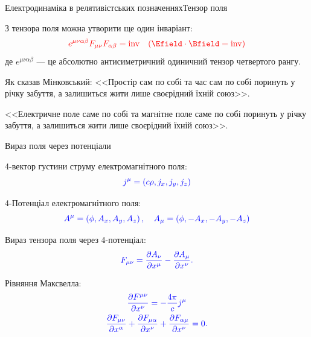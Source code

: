 \documentclass[9pt]{beamer}
\begin{document}
\begin{frame}{Електродинаміка в релятивістських позначеннях}{Тензор поля}
\begin{overprint}
	З тензора поля можна утворити ще один інваріант:
	\begin{equation*}\color{red}
		e^{\mu\nu\alpha\beta}F_{\mu\nu}F_{\alpha\beta} = \mathrm{inv}  \quad (\Efield\cdot\Bfield = \mathrm{inv})
	\end{equation*}
	де $  e^{\mu\nu\alpha\beta}$ --- це абсолютно антисиметричний одиничний тензор четвертого рангу.
	\onslide<2>
	\begin{block}{}
		Як сказав Мінковський: <<Простір сам по собі та час сам по собі поринуть у річку забуття, а залишиться жити лише своєрідний їхній союз>>.
	\end{block}
	\begin{block}{}
		<<Електричне поле саме по собі та магнітне поле саме по собі поринуть у річку забуття, а залишиться жити лише своєрідний їхній союз>>.
	\end{block}

\end{overprint}


\end{frame}





\begin{frame}{Вираз поля через потенціали}{}

	4-вектор густини струму електромагнітного поля:
	\begin{equation*}\color{blue}
		j^{\mu} = \left( c\rho, {j}_x, {j}_y, {j}_z \right)
	\end{equation*}

	4-Потенціал електромагнітного поля:
	\begin{equation*}\color{blue}
		A^{\mu} = \left( \phi, {A}_x, {A}_y, {A}_z \right), \quad A_{\mu} = \left( \phi, -{A}_x, -{A}_y, -{A}_z \right)
	\end{equation*}

	Вираз тензора поля через 4-потенціал:
	\begin{equation*}\color{blue}
		F_{\mu\nu} = \frac{\partial A_{\nu}}{\partial x^{\mu}} - \frac{\partial A_{\mu}}{\partial x^{\nu}}.
	\end{equation*}

	Рівняння Максвелла:
	\begin{gather*}\color{blue}
		\frac{\partial F^{\mu\nu}}{\partial x^\nu} =                                                                                -\frac{4\pi}{c}j^\mu \\
		\color{blue}
		\frac{\partial F_{\mu\nu}}{\partial x^\alpha} + \frac{\partial F_{\mu\alpha}}{\partial x^\nu} +\frac{\partial F_{\alpha\mu}}{\partial x^\nu}  = 0.
	\end{gather*}

\end{frame}
\end{document}
